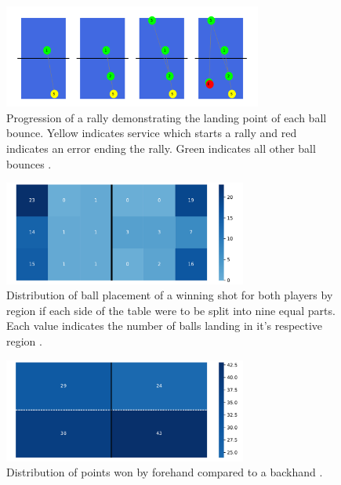 \begin{figure}[ht]
\centering

\includegraphics[width=8.5cm]{plots/tablesequence.pdf}
\caption{Progression of a rally demonstrating the landing point of each ball bounce. Yellow indicates service which starts a rally and red indicates an error ending the rally. Green indicates all other ball bounces \cite{OSAI}.}

\label{fig:sequence}
\end{figure}

\begin{figure}[ht]
\centering

\includegraphics[width=8cm]{plots/tableheatmaplot.pdf}
\caption{Distribution of ball placement of a winning shot for both players by region if each side of the table were to be split into nine equal parts. Each value indicates the number of balls landing in it's respective region \cite{OSAI}.}

\label{fig:pos}
\end{figure}



\begin{figure}[ht]
\centering

\includegraphics[width=8cm]{plots/forehandvsbackhand.pdf}
\caption{Distribution of points won by forehand compared to a backhand \cite{OSAI}.}

\label{fig:fvbh}
\end{figure}

